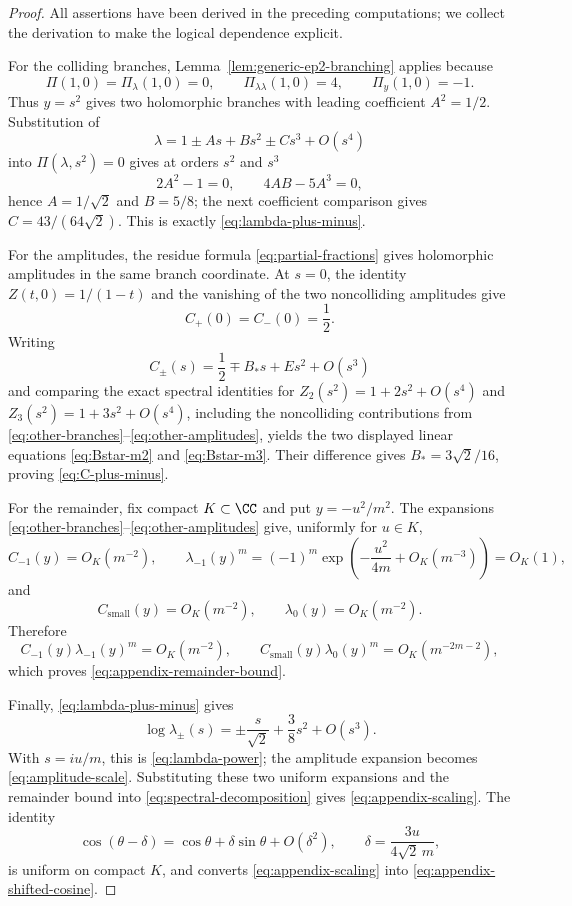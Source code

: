 \begin{proof}
All assertions have been derived in the preceding computations; we collect the derivation to make the logical dependence explicit.

For the colliding branches, Lemma~\ref{lem:generic-ep2-branching} applies because
\[
\Pi(1,0)=\Pi_\lambda(1,0)=0,
\qquad
\Pi_{\lambda\lambda}(1,0)=4,
\qquad
\Pi_y(1,0)=-1.
\]
Thus \(y=s^2\) gives two holomorphic branches with leading coefficient \(A^2=1/2\).
Substitution of
\[
\lambda=1\pm As+Bs^2\pm Cs^3+O(s^4)
\]
into \(\Pi(\lambda,s^2)=0\) gives at orders \(s^2\) and \(s^3\)
\[
2A^2-1=0,
\qquad
4AB-5A^3=0,
\]
hence \(A=1/\sqrt2\) and \(B=5/8\); the next coefficient comparison gives \(C=43/(64\sqrt2)\).
This is exactly \eqref{eq:lambda-plus-minus}.

For the amplitudes, the residue formula \eqref{eq:partial-fractions} gives holomorphic amplitudes in the same branch coordinate.
At \(s=0\), the identity \(Z(t,0)=1/(1-t)\) and the vanishing of the two noncolliding amplitudes give
\[
C_+(0)=C_-(0)=\frac12.
\]
Writing
\[
C_\pm(s)=\frac12\mp B_*s+E s^2+O(s^3)
\]
and comparing the exact spectral identities for \(Z_2(s^2)=1+2s^2+O(s^4)\) and \(Z_3(s^2)=1+3s^2+O(s^4)\), including the noncolliding contributions from \eqref{eq:other-branches}--\eqref{eq:other-amplitudes}, yields the two displayed linear equations \eqref{eq:Bstar-m2} and \eqref{eq:Bstar-m3}.
Their difference gives \(B_*=3\sqrt2/16\), proving \eqref{eq:C-plus-minus}.

For the remainder, fix compact \(K\subset\CC\) and put \(y=-u^2/m^2\).
The expansions \eqref{eq:other-branches}--\eqref{eq:other-amplitudes} give, uniformly for \(u\in K\),
\[
C_{-1}(y)=O_K(m^{-2}),
\qquad
\lambda_{-1}(y)^m=(-1)^m\exp\!\left(-\frac{u^2}{4m}+O_K(m^{-3})\right)=O_K(1),
\]
and
\[
C_{\mathrm{small}}(y)=O_K(m^{-2}),
\qquad
\lambda_0(y)=O_K(m^{-2}).
\]
Therefore
\[
C_{-1}(y)\lambda_{-1}(y)^m=O_K(m^{-2}),
\qquad
C_{\mathrm{small}}(y)\lambda_0(y)^m=O_K(m^{-2m-2}),
\]
which proves \eqref{eq:appendix-remainder-bound}.

Finally, \eqref{eq:lambda-plus-minus} gives
\[
\log\lambda_\pm(s)=\pm\frac{s}{\sqrt2}+\frac38s^2+O(s^3).
\]
With \(s=iu/m\), this is \eqref{eq:lambda-power}; the amplitude expansion becomes \eqref{eq:amplitude-scale}.
Substituting these two uniform expansions and the remainder bound into \eqref{eq:spectral-decomposition} gives \eqref{eq:appendix-scaling}.
The identity
\[
\cos(\theta-\delta)=\cos\theta+\delta\sin\theta+O(\delta^2),
\qquad
\delta=\frac{3u}{4\sqrt2\,m},
\]
is uniform on compact \(K\), and converts \eqref{eq:appendix-scaling} into \eqref{eq:appendix-shifted-cosine}.
\end{proof}

